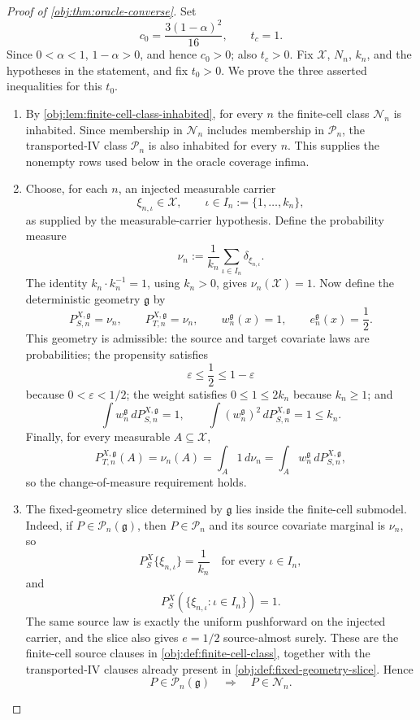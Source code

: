 \documentclass[11pt]{article}
\begin{document}
\begin{proof}[Proof of \cref{obj:thm:oracle-converse}]
Set
\[
  c_0=\frac{3(1-\alpha)^2}{16},
  \qquad
  t_c=1 .
\]
Since \(0<\alpha<1\), \(1-\alpha>0\), and hence \(c_0>0\); also \(t_c>0\).
Fix \(\mathcal X\), \(N_n\), \(k_n\), and the hypotheses in the statement, and fix
\(t_0>0\). We prove the three asserted inequalities for this \(t_0\).
\begin{enumerate}
\item By \cref{obj:lem:finite-cell-class-inhabited}, for every \(n\) the finite-cell class
\(\mathcal N_n\) is inhabited. Since membership in \(\mathcal N_n\) includes membership in
\(\mathcal P_n\), the transported-IV class \(\mathcal P_n\) is also inhabited for every \(n\).
This supplies the nonempty rows used below in the oracle coverage infima. %

\item Choose, for each \(n\), an injected measurable carrier
\[
  \xi_{n,\iota}\in\mathcal X,
  \qquad
  \iota\in I_n:=\{1,\ldots,k_n\},
\]
as supplied by the measurable-carrier hypothesis. Define the probability measure
\[
  \nu_n
  :=
  \frac1{k_n}\sum_{\iota\in I_n}\delta_{\xi_{n,\iota}} .
\]
The identity \(k_n\cdot k_n^{-1}=1\), using \(k_n>0\), gives
\(\nu_n(\mathcal X)=1\). Now define the deterministic geometry \(\mathfrak g\) by
\[
  P^{X,\mathfrak g}_{S,n}=\nu_n,
  \qquad
  P^{X,\mathfrak g}_{T,n}=\nu_n,
  \qquad
  w^{\mathfrak g}_n(x)=1,
  \qquad
  e^{\mathfrak g}_n(x)=\frac12 .
\]
This geometry is admissible: the source and target covariate laws are probabilities; the
propensity satisfies
\[
  \varepsilon\le \frac12\le 1-\varepsilon
\]
because \(0<\varepsilon<1/2\); the weight satisfies \(0\le 1\le 2k_n\) because
\(k_n\ge1\); and
\[
  \int w^{\mathfrak g}_n\,dP^{X,\mathfrak g}_{S,n}=1,
  \qquad
  \int (w^{\mathfrak g}_n)^2\,dP^{X,\mathfrak g}_{S,n}=1\le k_n .
\]
Finally, for every measurable \(A\subseteq\mathcal X\),
\[
  P^{X,\mathfrak g}_{T,n}(A)
  =
  \nu_n(A)
  =
  \int_A 1\,d\nu_n
  =
  \int_A w^{\mathfrak g}_n\,dP^{X,\mathfrak g}_{S,n},
\]
so the change-of-measure requirement holds. %

\item The fixed-geometry slice determined by \(\mathfrak g\) lies inside the finite-cell
submodel. Indeed, if
\(P\in\mathcal P_n(\mathfrak g)\), then \(P\in\mathcal P_n\) and its source covariate marginal
is \(\nu_n\), so
\[
  P_S^X\{\xi_{n,\iota}\}=\frac1{k_n}
  \quad\text{for every }\iota\in I_n,
\]
and
\[
  P_S^X\!\left(\{\xi_{n,\iota}:\iota\in I_n\}\right)=1 .
\]
The same source law is exactly the uniform pushforward on the injected carrier, and the slice
also gives \(e=1/2\) source-almost surely. These are the finite-cell source clauses in
\cref{obj:def:finite-cell-class}, together with the transported-IV clauses already present in
\cref{obj:def:fixed-geometry-slice}. Hence
\[
  P\in\mathcal P_n(\mathfrak g)
  \quad\Longrightarrow\quad
  P\in\mathcal N_n .
\] %


\end{enumerate}
\end{proof}
\end{document}
